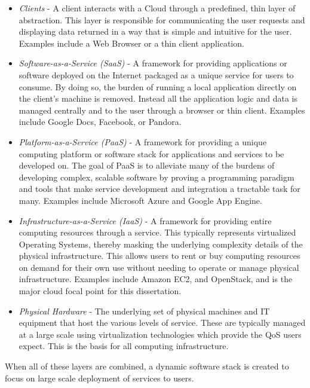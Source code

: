 \begin{itemize}
\item{\em Clients} - A client interacts with a Cloud through a predefined, thin layer of abstraction.  This layer is responsible for communicating the user requests and displaying data returned in a way that is simple and intuitive for the user. Examples include a Web Browser or a thin client application.

\item{\em Software-as-a-Service (SaaS)} - A framework for providing applications or software deployed on the Internet packaged as a unique service for users to consume.  By doing so, the burden of running a local application directly on the client's machine is removed.  Instead all the application logic and data is managed centrally and to the user through a browser or thin client.  Examples include Google Docs, Facebook, or Pandora.

\item{\em Platform-as-a-Service (PaaS)} - A framework for providing a unique computing platform or software stack for applications and services to be developed on.  The goal of PaaS is to alleviate many of the burdens of developing complex, scalable software by proving a programming paradigm and tools that make service development and integration a tractable task for many.  Examples include Microsoft Azure and Google App Engine.

\item{\em Infrastructure-as-a-Service (IaaS)} - A framework for providing entire computing resources through a service.  This typically represents virtualized Operating Systems, thereby masking the underlying complexity details of the physical infrastructure.  This allows users to rent or buy computing resources on demand for their own use without needing to operate or manage physical infrastructure.  Examples include Amazon EC2, and OpenStack, and is the major cloud focal point for this dissertation.
  
\item{\em Physical Hardware} - The underlying set of physical machines and IT equipment that host the various levels of service.  These are typically managed at a large scale using virtualization technologies which provide the QoS users expect.  This is the basis for all computing infrastructure.
\end{itemize}

When all of these layers are combined, a dynamic software stack is created to focus on large scale deployment of services to users.



